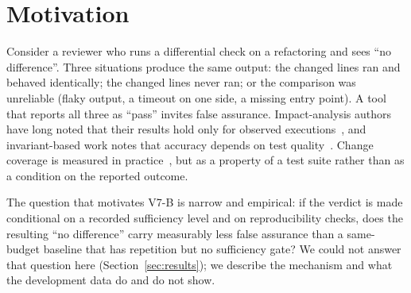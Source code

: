 \section{Motivation}\label{sec:motivation}
Consider a reviewer who runs a differential check on a refactoring and sees ``no difference''. Three situations produce the same output: the changed lines ran and behaved identically; the changed lines never ran; or the comparison was unreliable (flaky output, a timeout on one side, a missing entry point). A tool that reports all three as ``pass'' invites false assurance. Impact-analysis authors have long noted that their results hold only for observed executions~\cite{law2003,orso2003}, and invariant-based work notes that accuracy depends on test quality~\cite{ernst2001}. Change coverage is measured in practice~\cite{hilton2018a}, but as a property of a test suite rather than as a condition on the reported outcome.

The question that motivates V7-B is narrow and empirical: if the verdict is made conditional on a recorded sufficiency level and on reproducibility checks, does the resulting ``no difference'' carry measurably less false assurance than a same-budget baseline that has repetition but no sufficiency gate? We could not answer that question here (Section~\ref{sec:results}); we describe the mechanism and what the development data do and do not show.
